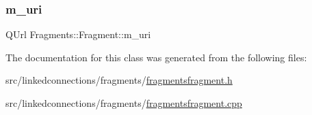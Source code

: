 \mbox{\label{classFragments_1_1Fragment_a5e60c2e6902a55c1e2a3bb7a97d390f5}} 
\subsubsection{\texorpdfstring{m\+\_\+uri}{m\_uri}}
{\footnotesize\ttfamily Q\+Url Fragments\+::\+Fragment\+::m\+\_\+uri\hspace{0.3cm}{\ttfamily [private]}}



The documentation for this class was generated from the following files\+:\begin{DoxyCompactItemize}
\item 
src/linkedconnections/fragments/\mbox{\hyperlink{fragmentsfragment_8h}{fragmentsfragment.\+h}}\item 
src/linkedconnections/fragments/\mbox{\hyperlink{fragmentsfragment_8cpp}{fragmentsfragment.\+cpp}}\end{DoxyCompactItemize}

